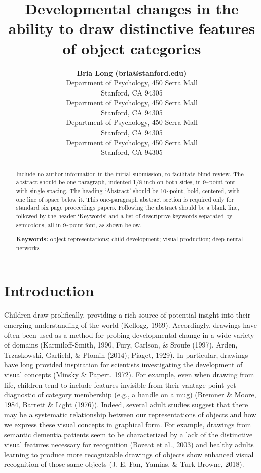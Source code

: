 \documentclass[10pt, letterpaper]{article}
\title{Developmental changes in the ability to draw distinctive features of
object categories}
\author{{\large \bf Bria Long (bria@stanford.edu)} \\ Department of Psychology, 450 Serra Mall \\ Stanford, CA 94305 \AND {\large \bf Judith E. Fan (jefan@stanford.edu)} \\Department of Psychology, 450 Serra Mall \\ Stanford, CA 94305 \AND {\large \bf Zixian Chai (zchai14@stanford.edu)} \\Department of Psychology, 450 Serra Mall \\ Stanford, CA 94305 \AND {\large \bf Michael C. Frank (mcfrank@stanford.edu)} \\Department of Psychology, 450 Serra Mall \\ Stanford, CA 94305}
\begin{document}
\maketitle

\begin{abstract}
Include no author information in the initial submission, to facilitate
blind review. The abstract should be one paragraph, indented 1/8 inch on
both sides, in 9\textasciitilde{}point font with single spacing. The
heading `Abstract' should be 10\textasciitilde{}point, bold, centered,
with one line of space below it. This one-paragraph abstract section is
required only for standard six page proceedings papers. Following the
abstract should be a blank line, followed by the header `Keywords' and a
list of descriptive keywords separated by semicolons, all in
9\textasciitilde{}point font, as shown below.

\textbf{Keywords:}
object representations; child development; visual production; deep
neural networks
\end{abstract}

\section{Introduction}\label{introduction}

Children draw prolifically, providing a rich source of potential insight
into their emerging understanding of the world (Kellogg, 1969).
Accordingly, drawings have often been used as a method for probing
developmental change in a wide variety of domains (Karmiloff-Smith,
1990, Fury, Carlson, \& Sroufe (1997), Arden, Trzaskowski, Garfield, \&
Plomin (2014); Piaget, 1929). In particular, drawings have long provided
inspiration for scientists investigating the development of visual
concepts (Minsky \& Papert, 1972). For example, even when drawing from
life, children tend to include features invisible from their vantage
point yet diagnostic of category membership (e.g., a handle on a mug)
(Bremner \& Moore, 1984, Barrett \& Light (1976)). Indeed, several adult
studies suggest that there may be a systematic relationship between our
representations of objects and how we express these visual concepts in
graphical form. For example, drawings from semantic dementia patients
seem to be characterized by a lack of the distinctive visual features
necessary for recognition (Bozeat et al., 2003) and healthy adults
learning to produce more recognizable drawings of objects show enhanced
visual recognition of those same objects (J. E. Fan, Yamins, \&
Turk-Browne, 2018).
\end{document}

